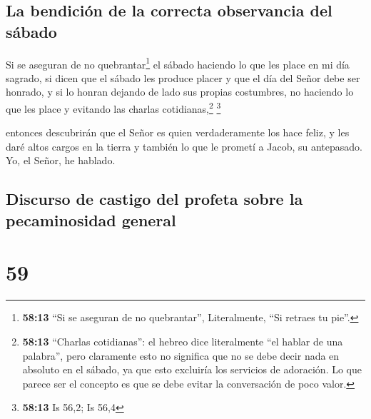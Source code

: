 \hypertarget{la-bendiciuxf3n-de-la-correcta-observancia-del-suxe1bado}{%
\subsection{La bendición de la correcta observancia del
sábado}\label{la-bendiciuxf3n-de-la-correcta-observancia-del-suxe1bado}}

 Si se aseguran de no quebrantar\footnote{\textbf{58:13}
  ``Si se aseguran de no quebrantar'', Literalmente, ``Si retraes tu
  pie''.} el sábado haciendo lo que les place en mi día sagrado, si
dicen que el sábado les produce placer y que el día del Señor debe ser
honrado, y si lo honran dejando de lado sus propias costumbres, no
haciendo lo que les place y evitando las charlas cotidianas,\footnote{\textbf{58:13}
  ``Charlas cotidianas'': el hebreo dice literalmente ``el hablar de una
  palabra'', pero claramente esto no significa que no se debe decir nada
  en absoluto en el sábado, ya que esto excluiría los servicios de
  adoración. Lo que parece ser el concepto es que se debe evitar la
  conversación de poco valor.} \footnote{\textbf{58:13} Is 56,2; Is 56,4}

 entonces descubrirán que el Señor es quien
verdaderamente los hace feliz, y les daré altos cargos en la tierra y
también lo que le prometí a Jacob, su antepasado. Yo, el Señor, he
hablado.

\hypertarget{discurso-de-castigo-del-profeta-sobre-la-pecaminosidad-general}{%
\subsection{Discurso de castigo del profeta sobre la pecaminosidad
general}\label{discurso-de-castigo-del-profeta-sobre-la-pecaminosidad-general}}

\hypertarget{section-58}{%
\section{59}\label{section-58}}

